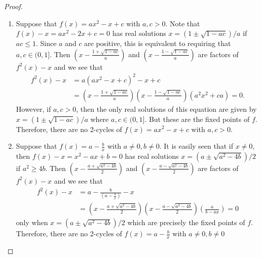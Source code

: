 \begin{proof}
\begin{enumerate}
    \item Suppose that $f(x) = ax^2 - x + c$ with $a, c > 0$. Note that $f(x) - x = ax^2 -2x + c = 0$
      has real solutions $x = \left(1 \pm \sqrt{1 - a c}\right)/a$ if $ac \leq 1$. Since $a$ and $c$ are positive,
      this is equivalent to requiring that $a,c \in (0, 1]$. Then $\left(x - \frac{1 + \sqrt{1 - a c}}{a}\right)$ and $\left(x - \frac{1 - \sqrt{1 - a c}}{a}\right)$
      are factors of $f^2(x) - x$ and we see that
      \begin{align*}
        f^2(x) - x &= a\left(ax^2 - x + c\right)^2 - x + c \\
        &= \left(x - \frac{1 + \sqrt{1 - a c}}{a}\right)\left(x - \frac{1 - \sqrt{1 - a c}}{a}\right)\left(a^2x^2+ca\right) = 0.
      \end{align*}
      However, if $a, c > 0$, then the only real solutions of this equation are given by  $x = \left(1 \pm \sqrt{1 - a c}\right)/a$ where $a,c \in (0,1]$.
      But these are the fixed points of $f$. Therefore, there are no 2-cycles of $f(x) = ax^2 - x + c$ with $a,c > 0$.

    \item Suppose that $f(x) = a - \frac{b}{x}$ with $a\neq 0, b \neq 0$. It is easily seen
      that if $x\neq 0$, then $f(x) - x = x^2 -ax + b = 0$ has real
      solutions $x = (a \pm \sqrt{a^2 - 4 b})/2$ if $a^2 \geq 4b$. Then
      $\left(x - \frac{a + \sqrt{a^2 - 4 b}}{2}\right)$ and $\left(x - \frac{a - \sqrt{a^2 - 4 b}}{2}\right)$
      are factors of $f^2(x) - x$ and we see that
      \begin{align*}
        f^2(x) - x &= a - \frac{b}{\left(a - \frac{b}{x}\right)} - x\\
        &= \left(x - \frac{a + \sqrt{a^2 - 4 b}}{2}\right)\left(x - \frac{a - \sqrt{a^2 - 4 b}}{2}\right) \left(\frac{a}{b - a x}\right) = 0
      \end{align*}
      only when $x = (a \pm \sqrt{a^2 - 4 b})/2$ which are precisely the fixed points of $f$. Therefore, there are no 2-cycles of $f(x) = a - \frac{b}{x}$ with $a\neq 0, b \neq 0$


\end{enumerate}
\end{proof}
